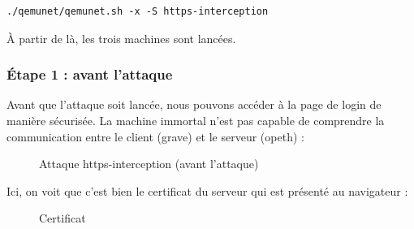 \begin{verbatim}
./qemunet/qemunet.sh -x -S https-interception
\end{verbatim}

À partir de là, les trois machines sont lancées.

\subsubsection{Étape 1 : avant l'attaque}

Avant que l'attaque soit lancée, nous pouvons accéder à la page de login de manière sécurisée. La machine immortal n'est pas capable de comprendre la communication entre le client (grave) et le serveur (opeth) :

\begin{figure}[H]
  \caption{Attaque https-interception (avant l'attaque)}
\end{figure}

Ici, on voit que c'est bien le certificat du serveur qui est présenté au navigateur :

\begin{figure}[H]
  \caption{Certificat}
\end{figure}

